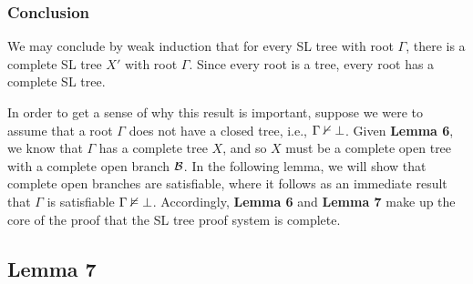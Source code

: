 \subsubsection{Conclusion}

We may conclude by weak induction that for every SL tree with root $\Gamma$, there is a complete SL tree $X'$ with root $\Gamma$. 
Since every root is a tree, every root has a complete SL tree.

In order to get a sense of why this result is important, suppose we were to assume that a root $\Gamma$ does not have a closed tree, i.e., $\Gamma \nvdash \bot$.
Given \textbf{Lemma 6}, we know that $\Gamma$ has a complete tree $X$, and so $X$ must be a complete open tree with a complete open branch $\mathcal{B}$.
In the following lemma, we will show that complete open branches are satisfiable, where it follows as an immediate result that $\Gamma$ is satisfiable $\Gamma \nvDash \bot$. 
Accordingly, \textbf{Lemma 6} and \textbf{Lemma 7} make up the core of the proof that the SL tree proof system is complete.




\subsection{Lemma 7}

%
%
%


